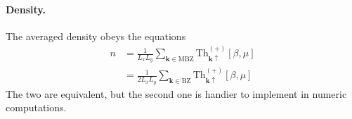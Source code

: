 \paragraph{Density.}

The averaged density obeys the equations
\begin{align}
	n &= \frac{1}{L_x L_y} \sum_{\mathbf{k} \in \mathrm{MBZ}} \mathrm{Th}_{\mathbf{k}\uparrow}^{(+)}[\beta,\mu] \label{eq:af-hm-n-MBZ-Th} \\
	&= \frac{1}{2L_x L_y} \sum_{\mathbf{k} \in \mathrm{BZ}} \mathrm{Th}_{\mathbf{k}\uparrow}^{(+)}[\beta,\mu] \label{eq:af-hm-n-BZ-Th}
\end{align}
The two are equivalent, but the second one is handier to implement in numeric computations.

\begin{tabproof}
	

\end{tabproof}
